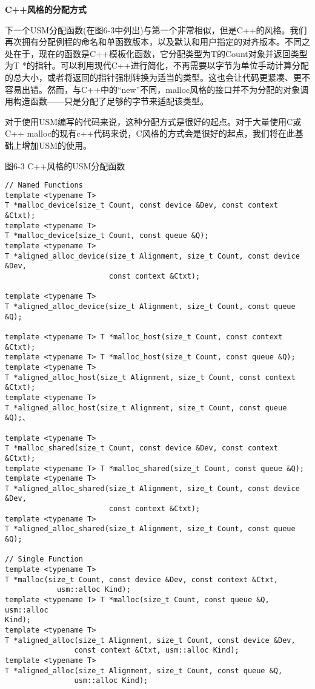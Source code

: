 \hspace*{\fill} \par %
\textbf{C++风格的分配方式}

下一个USM分配函数(在图6-3中列出)与第一个非常相似，但是C++的风格。我们再次拥有分配例程的命名和单函数版本，以及默认和用户指定的对齐版本。不同之处在于，现在的函数是C++模板化函数，它分配类型为T的Count对象并返回类型为T *的指针。可以利用现代C++进行简化，不再需要以字节为单位手动计算分配的总大小，或者将返回的指针强制转换为适当的类型。这也会让代码更紧凑、更不容易出错。然而，与C++中的“new”不同，malloc风格的接口并不为分配的对象调用构造函数——只是分配了足够的字节来适配该类型。\par

对于使用USM编写的代码来说，这种分配方式是很好的起点。对于大量使用C或C++ malloc的现有c++代码来说，C风格的方式会是很好的起点，我们将在此基础上增加USM的使用。\par

\hspace*{\fill} \par %
图6-3 C++风格的USM分配函数
\begin{lstlisting}[caption={}]
// Named Functions
template <typename T>
T *malloc_device(size_t Count, const device &Dev, const context &Ctxt); 
template <typename T> 
T *malloc_device(size_t Count, const queue &Q); 
template <typename T>
T *aligned_alloc_device(size_t Alignment, size_t Count, const device &Dev,
						const context &Ctxt); 

template <typename T>
T *aligned_alloc_device(size_t Alignment, size_t Count, const queue &Q); 

template <typename T> T *malloc_host(size_t Count, const context &Ctxt);
template <typename T> T *malloc_host(size_t Count, const queue &Q);
template <typename T>
T *aligned_alloc_host(size_t Alignment, size_t Count, const context &Ctxt);
template <typename T>
T *aligned_alloc_host(size_t Alignment, size_t Count, const queue &Q);、

template <typename T>
T *malloc_shared(size_t Count, const device &Dev, const context &Ctxt);
template <typename T> T *malloc_shared(size_t Count, const queue &Q);
template <typename T>
T *aligned_alloc_shared(size_t Alignment, size_t Count, const device &Dev,
						const context &Ctxt);				
template <typename T>
T *aligned_alloc_shared(size_t Alignment, size_t Count, const queue &Q);

// Single Function
template <typename T>
T *malloc(size_t Count, const device &Dev, const context &Ctxt,
			usm::alloc Kind);
template <typename T> T *malloc(size_t Count, const queue &Q, usm::alloc
Kind);
template <typename T>
T *aligned_alloc(size_t Alignment, size_t Count, const device &Dev,
				const context &Ctxt, usm::alloc Kind);
template <typename T>
T *aligned_alloc(size_t Alignment, size_t Count, const queue &Q,
				usm::alloc Kind);
\end{lstlisting}

